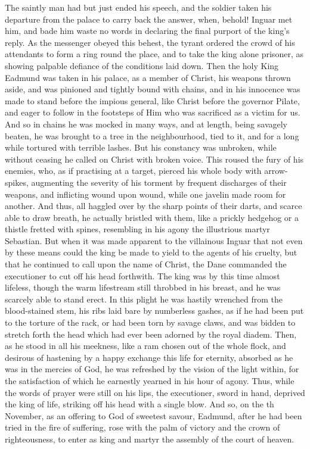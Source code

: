 \documentclass[10pt]{book}
\begin{document}
\begin{paracol}{2}
The saintly man had but just ended his speech, and the soldier taken his departure from the palace to carry back the answer, when, behold! Inguar met him, and bade him waste no words in declaring the final purport of the king's reply. As the messenger obeyed this behest, the tyrant ordered the crowd of his attendants to form a ring round the place, and to take the king alone prisoner, as showing palpable defiance of the conditions laid down. Then the holy King Eadmund was taken in his palace, as a member of Christ, his weapons thrown aside, and was pinioned and tightly bound with chains, and in his innocence was made to stand before the impious general, like Christ before the governor Pilate, and eager to follow in the footsteps of Him who was sacrificed as a victim for us. And so in chains he was mocked in many ways, and at length,  being savagely beaten, he was brought to a tree in the neighbourhood, tied to it, and for a long while tortured with terrible lashes. But his constancy was unbroken, while without ceasing he called on Christ with broken voice. This roused the fury of his enemies, who, as if practising at a target, pierced his whole body with arrow-spikes, augmenting the severity of his torment by frequent discharges of their weapons, and inflicting wound upon wound, while one javelin made room for another. And thus, all haggled over by the sharp points of their darts, and scarce able to draw breath, he actually bristled with them, like a prickly hedgehog or a thistle fretted with spines, resembling in his agony the illustrious martyr Sebastian. But when it was made apparent to the villainous Inguar that not even by these means could the king be made to yield to the agents of his cruelty, but that he continued to call upon the name of Christ, the Dane commanded the executioner to cut off his head forthwith. The king was by this time almost lifeless, though the warm lifestream still throbbed in his breast, and he was scarcely able to stand erect. In this plight he was hastily wrenched from the blood-stained stem, his ribs laid bare by numberless gashes, as if he had been put to the torture of the rack, or had been torn by savage claws, and was bidden to stretch forth the head which had ever been adorned by the royal diadem. Then, as he stood in all his meekness, like a ram chosen out of the whole flock, and desirous of hastening by a happy exchange this life for eternity, absorbed as he was in the mercies of God, he was refreshed by the vision of the light within, for the satisfaction of which he earnestly yearned in his hour of agony. Thus, while the words of prayer were still on his lips, the executioner, sword in hand, deprived the king of life, striking off his head with a single blow. And so, on the th November, as an offering to God of sweetest savour, Eadmund, after he had been tried in the fire of suffering, rose with the palm of victory and the crown of righteousness, to enter as king and martyr the assembly of the court of heaven.


\end{paracol}
\end{document}
